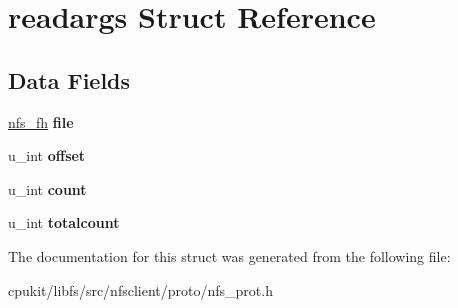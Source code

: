 \hypertarget{structreadargs}{}\section{readargs Struct Reference}
\label{structreadargs}
\subsection*{Data Fields}
\begin{DoxyCompactItemize}
\item 
\mbox{\label{structreadargs_adbadf94a691d789d6d918a090006e6ab}} 
\mbox{\hyperlink{structnfs__fh}{nfs\+\_\+fh}} {\bfseries file}
\item 
\mbox{\label{structreadargs_a9de9c03d42ec35d38fda335a9c19e9d6}} 
u\+\_\+int {\bfseries offset}
\item 
\mbox{\label{structreadargs_adf9a062095b8f61c8645e44da7e91192}} 
u\+\_\+int {\bfseries count}
\item 
\mbox{\label{structreadargs_a81522b9e14a66e83f7364884bbcb4c49}} 
u\+\_\+int {\bfseries totalcount}
\end{DoxyCompactItemize}


The documentation for this struct was generated from the following file\+:\begin{DoxyCompactItemize}
\item 
cpukit/libfs/src/nfsclient/proto/nfs\+\_\+prot.\+h\end{DoxyCompactItemize}
